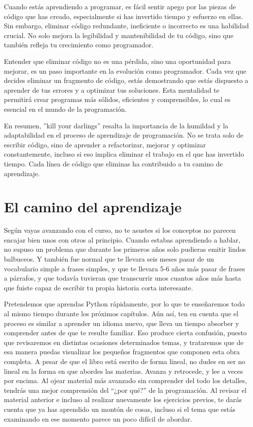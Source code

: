 Cuando estás aprendiendo a programar, es fácil sentir apego por las piezas de código que has creado, especialmente si has invertido tiempo y esfuerzo en ellas. Sin embargo, eliminar código redundante, ineficiente o incorrecto es una habilidad crucial. No solo mejora la legibilidad y mantenibilidad de tu código, sino que también refleja tu crecimiento como programador.

Entender que eliminar código no es una pérdida, sino una oportunidad para mejorar, es un paso importante en la evolución como programador. Cada vez que decides eliminar un fragmento de código, estás demostrando que estás dispuesto a aprender de tus errores y a optimizar tus soluciones. Esta mentalidad te permitirá crear programas más sólidos, eficientes y comprensibles, lo cual es esencial en el mundo de la programación.

En resumen, ''kill your darlings'' resalta la importancia de la humildad y la adaptabilidad en el proceso de aprendizaje de programación. No se trata solo de escribir código, sino de aprender a refactorizar, mejorar y optimizar constantemente, incluso si eso implica eliminar el trabajo en el que has invertido tiempo. Cada línea de código que eliminas ha contribuido a tu camino de aprendizaje.




\hypertarget{el-camino-del-aprendizaje}{%
\section{El camino del aprendizaje}\label{el-camino-del-aprendizaje}}

Según vayas avanzando con el curso, no te asustes si los conceptos no
parecen encajar bien unos con otros al principio. Cuando estabas
aprendiendo a hablar, no supuso un problema que durante los primeros
años solo pudieras emitir lindos balbuceos. Y también fue normal que te
llevara seis meses pasar de un vocabulario simple a frases simples, y
que te llevara 5-6 años más pasar de frases a párrafos, y que todavía
tuvieran que transcurrir unos cuantos años más hasta que fuiste capaz de
escribir tu propia historia corta interesante.

Pretendemos que aprendas Python rápidamente, por lo que te enseñaremos
todo al mismo tiempo durante los próximos capítulos. Aún así, ten en
cuenta que el proceso es similar a aprender un idioma nuevo, que lleva
un tiempo absorber y comprender antes de que te resulte familiar. Eso
produce cierta confusión, puesto que revisaremos en distintas ocasiones
determinados temas, y trataremos que de esa manera puedas visualizar los
pequeños fragmentos que componen esta obra completa. A pesar de que el
libro está escrito de forma lineal, no dudes en ser no lineal en la
forma en que abordes las materias. Avanza y retrocede, y lee a veces por
encima. Al ojear material más avanzado sin comprender del todo los
detalles, tendrás una mejor comprensión del ``¿por qué?'' de la
programación. Al revisar el material anterior e incluso al realizar
nuevamente los ejercicios previos, te darás cuenta que ya has aprendido
un montón de cosas, incluso si el tema que estás examinando en ese
momento parece un poco difícil de abordar.

